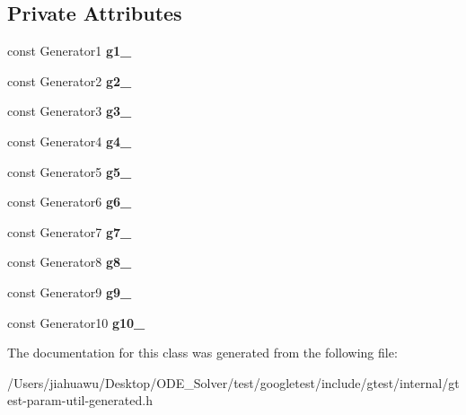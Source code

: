 \subsection*{Private Attributes}
\begin{DoxyCompactItemize}
\item 
\mbox{\label{classtesting_1_1internal_1_1_cartesian_product_holder10_a5245be8030d0a6f728636447bc1cf8f4}} 
const Generator1 {\bfseries g1\+\_\+}
\item 
\mbox{\label{classtesting_1_1internal_1_1_cartesian_product_holder10_a7cc917fc3bd30ffd2dfbeadbdee8dd15}} 
const Generator2 {\bfseries g2\+\_\+}
\item 
\mbox{\label{classtesting_1_1internal_1_1_cartesian_product_holder10_a5decf155de93ea84e0140f8df29f07bf}} 
const Generator3 {\bfseries g3\+\_\+}
\item 
\mbox{\label{classtesting_1_1internal_1_1_cartesian_product_holder10_afd929d5307f5c1a96779984b1fa80f79}} 
const Generator4 {\bfseries g4\+\_\+}
\item 
\mbox{\label{classtesting_1_1internal_1_1_cartesian_product_holder10_a1bb10afd785cd8ac642d25476799ffe9}} 
const Generator5 {\bfseries g5\+\_\+}
\item 
\mbox{\label{classtesting_1_1internal_1_1_cartesian_product_holder10_a87bbc83960add56e3ff211d60cdc4fe2}} 
const Generator6 {\bfseries g6\+\_\+}
\item 
\mbox{\label{classtesting_1_1internal_1_1_cartesian_product_holder10_a75259b2cb4a948bcfbba73d8172094ee}} 
const Generator7 {\bfseries g7\+\_\+}
\item 
\mbox{\label{classtesting_1_1internal_1_1_cartesian_product_holder10_a36ca15e2c00185d4a584ab27c40bfafe}} 
const Generator8 {\bfseries g8\+\_\+}
\item 
\mbox{\label{classtesting_1_1internal_1_1_cartesian_product_holder10_a53dcc18bd666a15fbb89eefb279f7fec}} 
const Generator9 {\bfseries g9\+\_\+}
\item 
\mbox{\label{classtesting_1_1internal_1_1_cartesian_product_holder10_a71670bf8a60fe6e01dcc5278e089fc6c}} 
const Generator10 {\bfseries g10\+\_\+}
\end{DoxyCompactItemize}


The documentation for this class was generated from the following file\+:\begin{DoxyCompactItemize}
\item 
/\+Users/jiahuawu/\+Desktop/\+O\+D\+E\+\_\+\+Solver/test/googletest/include/gtest/internal/gtest-\/param-\/util-\/generated.\+h\end{DoxyCompactItemize}
